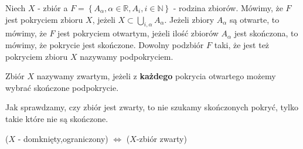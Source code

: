 \documentclass[../main.tex]{subfiles}
\begin{document}
    \begin{definicja}
        Niech $X$ - zbiór a $F = \left\{ A_\alpha, \alpha\in\mathbb{R}, A_i, i\in\mathbb{N} \right\} $ - rodzina zbiorów. Mówimy, że $F$ jest pokryciem zbioru $X$, jeżeli $X\subset \bigcup_{i,\alpha}A_\alpha$. Jeżeli zbiory $A_\alpha$ są otwarte, to mówimy, że $F$ jest pokryciem otwartym, jeżeli ilość zbiorów $A_\alpha$ jest skończona, to mówimy, że pokrycie jest skończone. Dowolny podzbiór $F$ taki, że jest też pokryciem zbioru $X$ nazywamy podpokryciem.
    \end{definicja}
    \begin{definicja}
        Zbiór $X$ nazywamy zwartym, jeżeli z \textbf{każdego} pokrycia otwartego możemy wybrać skończone podpokrycie.
    \end{definicja}
    Jak sprawdzamy, czy zbiór jest zwarty, to nie szukamy skończonych pokryć, tylko takie które nie są skończone.
    \begin{stw}
        ($X$ - domknięty,ograniczony) $\iff$ ($X$-zbiór zwarty)
    \end{stw}
\end{document}

